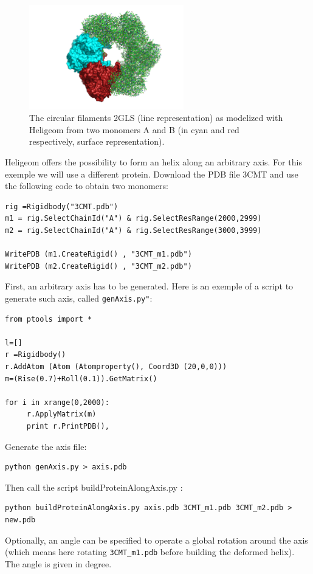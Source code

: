 \documentclass[12pt,a4paper]{article}
\begin{document}
\begin{figure}[htbp]
\center
\includegraphics*[width=0.60\textwidth]{img/2GLS.png}
\caption{The circular filaments 2GLS (line representation) as modelized with Heligeom from two monomers A and B (in cyan and red respectively, surface representation).}
\label{2gls}
\end{figure}


Heligeom offers the possibility to form an helix along an arbitrary axis. For this exemple we will use a different protein. Download the PDB file 3CMT and use the following code to obtain two monomers:
\begin{verbatim}
rig =Rigidbody("3CMT.pdb")
m1 = rig.SelectChainId("A") & rig.SelectResRange(2000,2999)
m2 = rig.SelectChainId("A") & rig.SelectResRange(3000,3999)

WritePDB (m1.CreateRigid() , "3CMT_m1.pdb")
WritePDB (m2.CreateRigid() , "3CMT_m2.pdb")
\end{verbatim}       
First, an arbitrary axis has to be generated. Here is an exemple of a script to generate such axis, called \texttt{genAxis.py"}:
\begin{verbatim}
from ptools import *

l=[]
r =Rigidbody()
r.AddAtom (Atom (Atomproperty(), Coord3D (20,0,0)))
m=(Rise(0.7)+Roll(0.1)).GetMatrix()

for i in xrange(0,2000):
     r.ApplyMatrix(m)
     print r.PrintPDB(),
\end{verbatim} 

Generate the axis file:
\begin{verbatim}
python genAxis.py > axis.pdb
\end{verbatim}

Then call the script buildProteinAlongAxis.py : 
\begin{verbatim}
python buildProteinAlongAxis.py axis.pdb 3CMT_m1.pdb 3CMT_m2.pdb > new.pdb
\end{verbatim}

Optionally, an angle can be specified to operate a global rotation around the axis (which means here rotating \texttt{3CMT{\_}m1.pdb} before building the deformed helix). The angle is given in degree.
\end{document}

